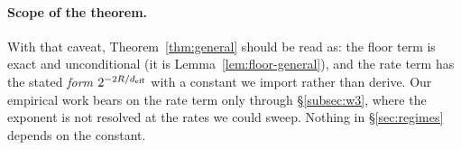 \paragraph{Scope of the theorem.} With that caveat, Theorem~\ref{thm:general} should
be read as: the floor term is exact and unconditional (it is
Lemma~\ref{lem:floor-general}), and the rate term has the stated
\emph{form} $2^{-2R/d_{\mathrm{eff}}}$ with a constant we import rather than derive. Our
empirical work bears on the rate term only through
\S\ref{subsec:w3}, where the exponent is not resolved at the rates we could
sweep. Nothing in \S\ref{sec:regimes} depends on the constant.
